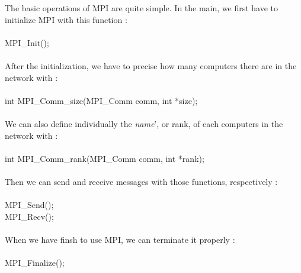 The basic operations of MPI are quite simple. In the main, we first have to initialize MPI with this function :\\\\
MPI\_Init();\\\\
After the initialization, we have to precise how many computers there are in the network with :\\\\
int MPI\_Comm\_size(MPI\_Comm comm, int *size);\\\\
We can also define individually the \textit{name}', or rank, of each computers in the network with :\\\\
int MPI\_Comm\_rank(MPI\_Comm comm, int *rank);\\\\
Then we can send and receive messages with those functions, respectively :\\\\
MPI\_Send();\\
MPI\_Recv();\\\\
When we have finsh to use MPI, we can terminate it properly :\\\\
MPI\_Finalize();\\